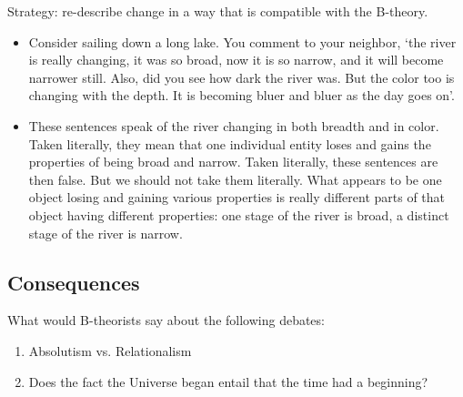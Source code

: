 \documentclass[oneside, 11]{article}
\begin{document}
\noindent Strategy: re-describe change in a way that is compatible with the B-theory. 

\begin{itemize}
\item Consider sailing down a long lake. You comment to your neighbor, `the river is really changing, it was so broad, now it is so narrow, and it will become narrower still. Also, did you see how dark the river was. But the color too is changing with the depth. It is becoming bluer and bluer as the day goes on'. 
\item These sentences speak of the river changing in both breadth and in color. Taken literally, they mean that one individual entity loses and gains the properties of being broad and narrow. Taken literally, these sentences are then false. But we should not take them literally. What appears to be one object losing and gaining various properties is really different parts of that object having different properties: one stage of the river is broad, a distinct stage of the river is narrow. 
\end{itemize}

\subsection*{Consequences}

What would B-theorists say about the following debates: 

\begin{enumerate}
\item Absolutism vs. Relationalism
\item Does the fact the Universe began entail that the time had a beginning? 
\end{enumerate}
\end{document}

